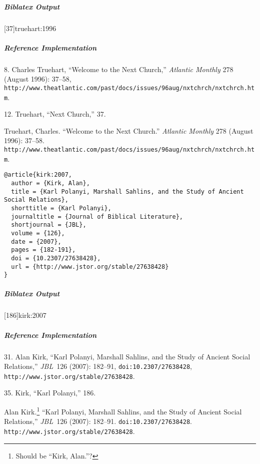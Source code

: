 \documentclass[a4paper]{article}
\newenvironment{biboutput}{%
  \subparagraph{Biblatex Output}
}{\color{black}}
\newenvironment{refimp}{%
  \subparagraph{Reference Implementation}
  \color{reference-colour}
  \rm
}{\par\color{black}}
\begin{document}
\begin{biboutput}
  [37]{truehart:1996}
\end{biboutput}

\begin{refimp}
  \hspace*{\bibindent}8. Charles Truehart, “Welcome to the Next Church,”
  \emph{Atlantic Monthly} 278 (August 1996): 37–58,
  \nolinkurl{http://www.theatlantic.com/past/docs/issues/96aug/nxtchrch/nxtchrch.htm}.

  \hspace*{\bibindent}12. Truehart, “Next Church,” 37.
 
  \sloppy\hangindent\bibindent Truehart, Charles. “Welcome to the Next Church.”
  \emph{Atlantic Monthly} 278 (August 1996): 37–58.
  \nolinkurl{http://www.theatlantic.com/past/docs/issues/96aug/nxtchrch/nxtchrch.htm}.
\end{refimp}

\begin{lstlisting}
@article{kirk:2007,
  author = {Kirk, Alan},
  title = {Karl Polanyi, Marshall Sahlins, and the Study of Ancient Social Relations},
  shorttitle = {Karl Polanyi},
  journaltitle = {Journal of Biblical Literature},
  shortjournal = {JBL},
  volume = {126},
  date = {2007},
  pages = {182-191},
  doi = {10.2307/27638428},
  url = {http://www.jstor.org/stable/27638428}
}
\end{lstlisting}

\begin{biboutput}
  [186]{kirk:2007}
\end{biboutput}

\begin{refimp}
  \hspace*{\bibindent}31. Alan Kirk, “Karl Polanyi, Marshall Sahlins, and the
  Study of Ancient Social Relations,” \emph{JBL}~126 (2007): 182–91,
  \nolinkurl{doi:10.2307/27638428},
  \nolinkurl{http://www.jstor.org/stable/27638428}.

  \hspace*{\bibindent}35. Kirk, “Karl Polanyi,” 186.

  \hangindent\bibindent Alan Kirk.\footnote{Should be “Kirk, Alan.”?} “Karl
  Polanyi, Marshall Sahlins, and the Study of Ancient Social Relations,”
  \emph{JBL}~126 (2007): 182–91. \nolinkurl{doi:10.2307/27638428}.
  \nolinkurl{http://www.jstor.org/stable/27638428}.

\end{refimp}
\end{document}
